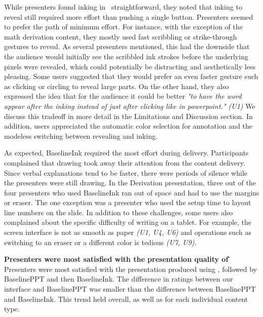 While presenters found inking in \interface\ straightforward, they noted that inking to reveal still required more effort than pushing a single button. Presenters seemed to prefer the path of minimum effort. For instance, with the exception of the math derivation content, they mostly used fast scribbling or strike-through gestures to reveal. As several presenters mentioned, this had the downside that the audience would initially see the scribbled ink strokes before the underlying pixels were revealed, which could potentially be distracting and aesthetically less pleasing. Some users suggested that they would prefer an even faster gesture such as clicking or circling to reveal large parts. On the other hand, they also expressed the idea that for the audience it could be better \textit{"to have the word appear after the inking instead of just after clicking like in powerpoint." (U1)} We discuss this tradeoff in more detail in the Limitations and Discussion section. %
%
In addition, users appreciated the automatic color selection for annotation and the modeless switching between revealing and inking. %

As expected, BaselineInk required the most effort during delivery. Participants complained that drawing took away their attention from the content delivery. Since verbal explanations tend to be faster, there were periods of silence while the presenters were still drawing. In the Derivation presentation, three out of the four presenters who used BaselineInk ran out of space and had to use the margins or eraser. The one exception was a presenter who used the setup time to layout line numbers on the slide. In addition to these challenges, some users also complained about the specific difficulty of writing on a tablet. For example, the screen interface is not as smooth as paper \textit{(U1, U4, U6)} and operations such as switching to an eraser or a different color is tedious \textit{(U7, U9)}. 

\textbf{Presenters were most satisfied with the presentation quality of \interface\.}
Presenters were most satisfied with the presentation produced using \interface, followed by BaselinePPT and then BaselineInk. 
%
The difference in ratings between our interface and BaselinePPT was smaller than the difference between BaselinePPT and BaselineInk.  
%
%
This trend held overall, as well as for each individual content type.

